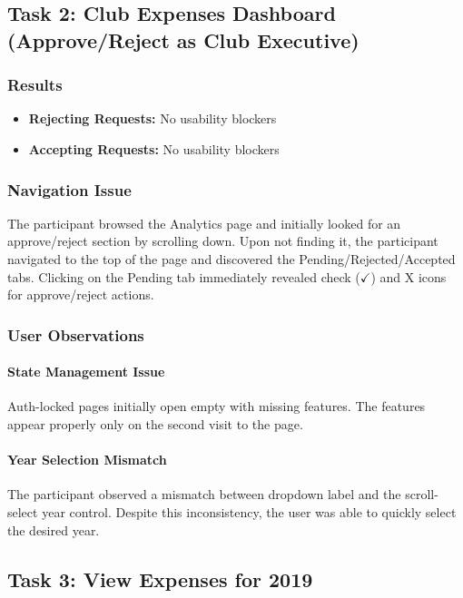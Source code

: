 \documentclass[12pt, titlepage]{article}
\begin{document}
\subsection{Task 2: Club Expenses Dashboard (Approve/Reject as Club Executive)}

\subsubsection{Results}
\begin{itemize}
    \item \textbf{Rejecting Requests:} No usability blockers
    \item \textbf{Accepting Requests:} No usability blockers
\end{itemize}

\subsubsection{Navigation Issue}
The participant browsed the Analytics page and initially looked for an approve/reject section by scrolling down. Upon not finding it, the participant navigated to the top of the page and discovered the Pending/Rejected/Accepted tabs. Clicking on the Pending tab immediately revealed check (\(\checkmark\)) and X icons for approve/reject actions.

\subsubsection{User Observations}

\paragraph{State Management Issue}
Auth-locked pages initially open empty with missing features. The features appear properly only on the second visit to the page.

\paragraph{Year Selection Mismatch}
The participant observed a mismatch between dropdown label and the scroll-select year control. Despite this inconsistency, the user was able to quickly select the desired year.

\subsection{Task 3: View Expenses for 2019}
\end{document}
